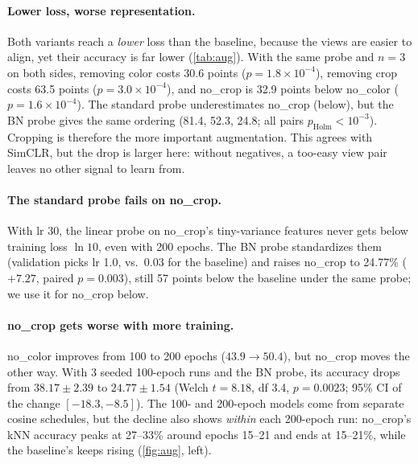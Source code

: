 \documentclass[10pt,twocolumn,letterpaper]{article}
\begin{document}
\paragraph{Lower loss, worse representation.}
Both variants reach a \emph{lower} loss than the baseline, because the views are easier to align, yet their accuracy is far lower (\cref{tab:aug}).
With the same probe and $n{=}3$ on both sides, removing color costs 30.6 points ($p{=}1.8\!\times\!10^{-4}$), removing crop costs 63.5 points ($p{=}3.0\!\times\!10^{-4}$), and no\_crop is 32.9 points below no\_color ($p{=}1.6\!\times\!10^{-4}$).
The standard probe underestimates no\_crop (below), but the BN probe gives the same ordering (81.4, 52.3, 24.8; all pairs $p_\text{Holm}<10^{-3}$).
Cropping is therefore the more important augmentation. This agrees with SimCLR, but the drop is larger here: without negatives, a too-easy view pair leaves no other signal to learn from.

\paragraph{The standard probe fails on no\_crop.}
With lr 30, the linear probe on no\_crop's tiny-variance features never gets below training loss $\ln 10$, even with 200 epochs.
The BN probe standardizes them (validation picks lr 1.0, vs.\ 0.03 for the baseline) and raises no\_crop to 24.77\% ($+7.27$, paired $p{=}0.003$), still 57 points below the baseline under the same probe; we use it for no\_crop below.

\paragraph{no\_crop gets worse with more training.}
no\_color improves from 100 to 200 epochs ($43.9\rightarrow50.4$), but no\_crop moves the other way.
With 3 seeded 100-epoch runs and the BN probe, its accuracy drops from $38.17\pm2.39$ to $24.77\pm1.54$ (Welch $t{=}8.18$, df 3.4, $p{=}0.0023$; 95\% CI of the change $[-18.3,-8.5]$).
The 100- and 200-epoch models come from separate cosine schedules, but the decline also shows \emph{within} each 200-epoch run: no\_crop's kNN accuracy peaks at 27--33\% around epochs 15--21 and ends at 15--21\%, while the baseline's keeps rising (\cref{fig:aug}, left).
\end{document}
